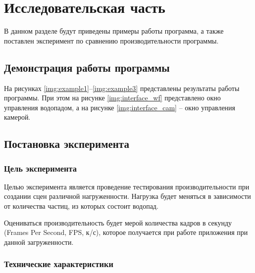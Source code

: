 \chapter{Исследовательская часть}

В данном разделе будут приведены примеры работы программа, а также поставлен эксперимент по сравнению производительности программы.


\section{Демонстрация работы программы}

На рисунках \ref{img:example1}--\ref{img:example3} представлены результаты работы программы. При этом на рисунке \ref{img:interface_wf} представлено окно управления водопадом, а на рисунке \ref{img:interface_cam} -- окно управления камерой.









\clearpage


\section{Постановка эксперимента}

\subsection{Цель эксперимента}

Целью эксперимента является проведение тестирования производительности при создании сцен различной нагруженности. Нагрузка будет меняться в зависимости от количества частиц, из которых состоит водопад.

Оцениваться производительность будет мерой количества кадров в секунду (Frames Per Second, FPS, к/с), которое получается при работе приложения при данной загруженности.


\subsection{Технические характеристики}

